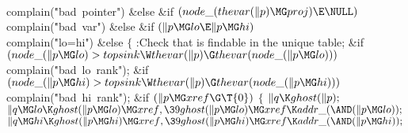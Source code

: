 \\{complain}(\.{"bad\ pointer"})\2\6
\&{else} \&{if} ${}(\\{node\_}(\\{thevar}(\|p)\MG\\{proj})\E\NULL){}$\1\5
\\{complain}(\.{"bad\ var"})\2\6
\&{else} \&{if} ${}(\|p\MG\\{lo}\E\|p\MG\\{hi}){}$\1\5
\\{complain}(\.{"lo=hi"})\2\6
\&{else}\5
${}\{{}$\1\6
:Check that  is findable in the unique table\X;\6
\&{if} ${}(\\{node\_}(\|p\MG\\{lo})>\\{topsink}\W\\{thevar}(\|p)\G\\{thevar}(%
\\{node\_}(\|p\MG\\{lo}))){}$\1\5
\\{complain}(\.{"bad\ lo\ rank"});\2\6
\&{if} ${}(\\{node\_}(\|p\MG\\{hi})>\\{topsink}\W\\{thevar}(\|p)\G\\{thevar}(%
\\{node\_}(\|p\MG\\{hi}))){}$\1\5
\\{complain}(\.{"bad\ hi\ rank"});\2\6
\&{if} ${}(\|p\MG\\{xref}\G\T{0}){}$\5
${}\{{}$\1\6
${}\|q\K\\{ghost}(\|p);{}$\6
${}\|q\MG\\{lo}\K\\{ghost}(\|p\MG\\{lo})\MG\\{xref},\39\\{ghost}(\|p\MG\\{lo})%
\MG\\{xref}\K\\{addr\_}({\AND}(\|p\MG\\{lo}));{}$\6
${}\|q\MG\\{hi}\K\\{ghost}(\|p\MG\\{hi})\MG\\{xref},\39\\{ghost}(\|p\MG\\{hi})%
\MG\\{xref}\K\\{addr\_}({\AND}(\|p\MG\\{hi}));{}$\6
